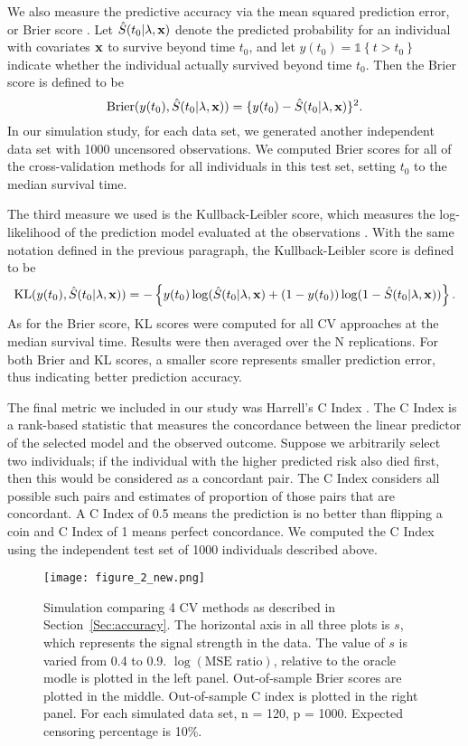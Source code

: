 We also measure the predictive accuracy via the mean squared prediction error, or Brier score \citep{VanHouwelingen2011}. Let $\hat{S}(t_0|\lambda, \mathbf{x})$ denote the predicted probability for an individual with covariates $\mathbf{x}$ to survive beyond time $t_0$, and let $y(t_0) = \mathbb{1}\left\{ t > t_{0}\right\}$ indicate whether the individual actually survived beyond time $t_0$. Then the Brier score is defined to be
\begin{equation}
\text{Brier}(y(t_0), \hat{S}(t_0|\lambda, \mathbf{x})) = \{ y(t_0) - \hat{S}(t_0|\lambda, \mathbf{x}) \}^2.
\end{equation}
In our simulation study, for each data set, we generated another independent data set with 1000 uncensored observations. We computed Brier scores for all of the cross-validation methods for all individuals in this test set, setting $t_0$ to the median survival time.

The third measure we used is the Kullback-Leibler score, which measures the log-likelihood of the prediction model evaluated at the observations \citep{VanHouwelingen2011}. With the same notation defined in the previous paragraph, the Kullback-Leibler score is defined to be
$$ \text{KL}(y(t_0), \hat{S}(t_0|\lambda, \mathbf{x})) = -\left\{ y(t_0)\log(\hat{S}(t_0|\lambda, \mathbf{x}) + (1 - y(t_0))\log(1 - \hat{S}(t_0|\lambda, \mathbf{x})) \right\}. $$
As for the Brier score, KL scores were computed for all CV approaches at the median survival time.  Results were then averaged over the N replications. For both Brier and KL scores, a smaller score represents smaller prediction error, thus indicating better prediction accuracy.

The final metric we included in our study was Harrell's C Index \citep{HarrellJr1984}. The C Index is a rank-based statistic that measures the concordance between the linear predictor of the selected model and the observed outcome. Suppose we arbitrarily select two individuals; if the individual with the higher predicted risk also died first, then this would be considered as a concordant pair. The C Index considers all possible such pairs and estimates of proportion of those pairs that are concordant. A C Index of 0.5 means the prediction is no better than flipping a coin and C Index of 1 means perfect concordance. We computed the C Index using the independent test set of 1000 individuals described above.

\begin{figure}[ht]
  \centering
  \texttt{[image: figure\_2\_new.png]}
  \caption{\label{Fig:mse-brier-c} Simulation comparing 4 CV methods as described in Section~\ref{Sec:accuracy}. The horizontal axis in all three plots is $s$, which represents the signal strength in the data. The value of $s$ is varied from 0.4 to 0.9. $\log(\text{MSE ratio})$, relative to the oracle modle is plotted in the left panel. Out-of-sample Brier scores are plotted in the middle. Out-of-sample C index is plotted in the right panel. For each simulated data set, n = 120, p = 1000. Expected censoring percentage is 10\%.}
\end{figure}	

